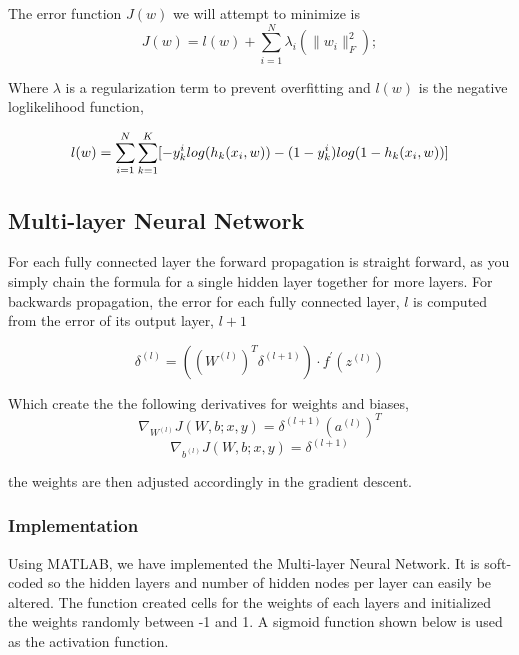 \documentclass[12pt, twocolumn]{article}
\begin{document}
The error function $J(w)$ we will attempt to minimize is 
\begin{equation}
J(w)= l(w) + \sum_{i=1}^N\lambda_{i}(\|w_i\|_F^2);
\end{equation}

Where  $\lambda$ is a regularization term to prevent overfitting and $l(w)$ is the negative loglikelihood function,

\begin{equation}
\scriptsize
l(w)=\sum_{i=1}^N \sum_{k=1}^K [-y^i_k log(h_k(x_i,w))-(1-y^i_k)log(1-h_k(x_i,w))]
\end{equation}


\subsection{Multi-layer Neural Network}


For each fully connected layer the forward propagation is straight forward, as you simply  chain the formula for a single hidden layer together for more layers.  For backwards propagation, the error for each fully connected layer, $l$ is computed from the error of its output layer, $l+1$  

\begin{equation}
\delta^{(l)}=((W^{(l)})^T \delta^{(l+1)}) \cdot f ^{\prime} (z^{(l)})
\end{equation}

Which create the the following derivatives for weights and biases, 
\begin{equation}
\nabla_{W^{(l)}}J(W,b;x,y) = \delta^{(l+1)}(a^{(l)})^T
\end{equation}
\begin{equation}
\nabla_{b^{(l)}}J(W,b;x,y)= \delta^{(l+1)}
\end{equation}

the weights are then adjusted accordingly in the gradient descent.



\subsubsection{Implementation}
Using MATLAB, we have implemented the Multi-layer Neural Network. It is soft-coded so the hidden layers and number of hidden nodes per layer can easily be altered. The function created cells for the weights of each layers and initialized the weights randomly between -1 and 1.
\newline
A sigmoid function shown below is used as the activation function.
\end{document}
